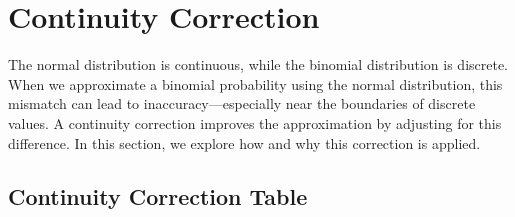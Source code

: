 \section{Continuity Correction}
The normal distribution is continuous, while the binomial distribution is discrete. When we approximate a binomial probability using the normal distribution, this mismatch can lead to inaccuracy—especially near the boundaries of discrete values. A continuity correction improves the approximation by adjusting for this difference. In this section, we explore how and why this correction is applied. \\
\subsection*{Continuity Correction Table}




